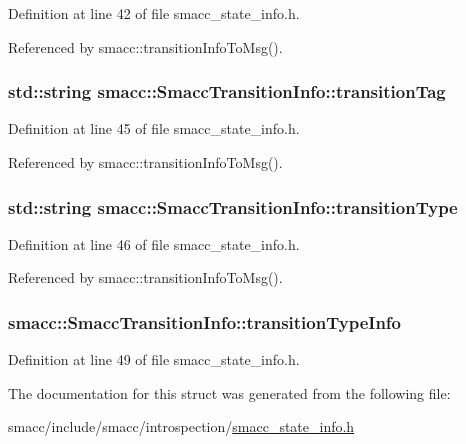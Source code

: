 Definition at line 42 of file smacc\+\_\+state\+\_\+info.\+h.



Referenced by smacc\+::transition\+Info\+To\+Msg().

\subsubsection[{\texorpdfstring{transition\+Tag}{transitionTag}}]{\setlength{\rightskip}{0pt plus 5cm}std\+::string smacc\+::\+Smacc\+Transition\+Info\+::transition\+Tag}\hypertarget{structsmacc_1_1SmaccTransitionInfo_ae9690118ca428a62997043135106de6b}{}\label{structsmacc_1_1SmaccTransitionInfo_ae9690118ca428a62997043135106de6b}


Definition at line 45 of file smacc\+\_\+state\+\_\+info.\+h.



Referenced by smacc\+::transition\+Info\+To\+Msg().

\subsubsection[{\texorpdfstring{transition\+Type}{transitionType}}]{\setlength{\rightskip}{0pt plus 5cm}std\+::string smacc\+::\+Smacc\+Transition\+Info\+::transition\+Type}\hypertarget{structsmacc_1_1SmaccTransitionInfo_a0d0954ea8c789c13ab226617d257906b}{}\label{structsmacc_1_1SmaccTransitionInfo_a0d0954ea8c789c13ab226617d257906b}


Definition at line 46 of file smacc\+\_\+state\+\_\+info.\+h.



Referenced by smacc\+::transition\+Info\+To\+Msg().

\subsubsection[{\texorpdfstring{transition\+Type\+Info}{transitionTypeInfo}}]{ smacc\+::\+Smacc\+Transition\+Info\+::transition\+Type\+Info}\hypertarget{structsmacc_1_1SmaccTransitionInfo_acce805ee4d76ea1e76088d776f44b517}{}\label{structsmacc_1_1SmaccTransitionInfo_acce805ee4d76ea1e76088d776f44b517}


Definition at line 49 of file smacc\+\_\+state\+\_\+info.\+h.



The documentation for this struct was generated from the following file\+:\begin{DoxyCompactItemize}
\item 
smacc/include/smacc/introspection/\hyperlink{smacc__state__info_8h}{smacc\+\_\+state\+\_\+info.\+h}\end{DoxyCompactItemize}
